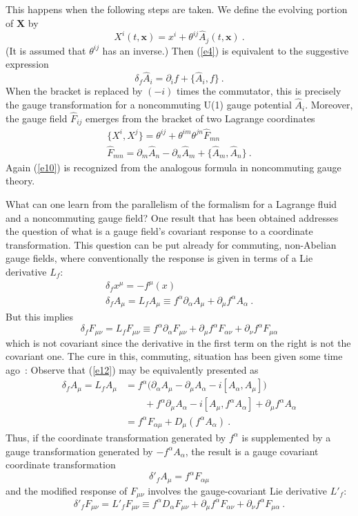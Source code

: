 \documentclass[a4paper,12pt,twoside]{article}
\newcommand{\numeq}[2]{\begin{equation}
#2
\label{#1}
\end{equation}}
\newcommand{\refeq}[1]{(\ref{#1})}
\let\vec\boldsymbol
\let\hat\widehat
\begin{document}
This happens when the following steps are taken. We define the evolving portion of $\vec X$ by 
\numeq{e7}{
X^i (t,\vec x) = x^i + \theta^{ij} \hat A_j (t,\vec x)\ .
}
(It is assumed that $\theta^{ij}$ has an inverse.)
Then \refeq{e4} is equivalent to the suggestive expression
\numeq{e8}{
\delta_f \hat A_i = \partial_i f + \bigl\{\hat A_i, f\bigr\}\ .
}
When the bracket is replaced by $(-i)$ times the commutator, this is precisely the gauge
transformation for a noncommuting U(1) gauge potential $\hat A_i$. Moreover, the gauge field
$\hat F_{ij}$ emerges from the bracket of two Lagrange coordinates
\begin{gather}
\bigl\{ X^i, X^j\bigr\} = \theta^{ij} + \theta^{im} \theta^{jn} \hat F_{mn} \label{e9}\\
\hat F_{mn}  = \partial_m \hat A_n - \partial_n \hat A_m + \bigl\{\hat A_m, \hat  A_n\bigr\}\ . 
\label{e10}
\end{gather}
Again \refeq{e10} is recognized from the analogous formula
in noncommuting gauge theory.

What can one learn from the parallelism of the formalism for a Lagrange fluid and a
noncommuting gauge field? One result that has been obtained addresses the question of what
is  a gauge field's covariant response to a coordinate transformation. This question can be put
already for commuting, non-Abelian gauge fields, where conventionally the response is
given in terms of a Lie derivative $L_f$:
\begin{gather}
\delta_f x^\mu = - f^\mu(x) \label{e11}\\
\delta_f A_\mu = L_f A_\mu \equiv f^\alpha \partial_\alpha A_\mu + \partial_\mu f^\alpha
A_\alpha
 \ . 
\label{e12}
\end{gather}
But this implies
\numeq{e13}{
\delta_f F_{\mu\nu} = L_f F_{\mu\nu} \equiv f^\alpha \partial_\alpha F_{\mu\nu} + 
\partial_\mu f^\alpha F_{\alpha\nu} +  \partial_\nu f^\alpha F_{\mu\alpha}  
}
which is not covariant since the derivative in the first term on the right is not the covariant
one. The cure in this, commuting, situation has been given some time ago~\cite{r5}:  Observe
that
\refeq{e12} may be equivalently presented as 
\numeq{e14}{
\begin{aligned}
\delta_f A_\mu = L_f A_\mu &= f^\alpha \bigl(
\partial_\alpha A_\mu -\partial_\mu A_\alpha - i [A_\alpha, A_\mu]
\bigr) \\
&\qquad{}+ f^\alpha \partial_\mu A_\alpha  - i [  A_\mu, f^\alpha A_\alpha] + 
\partial_\mu f^\alpha A_\alpha\\
 &= f^\alpha F_{\alpha\mu} +  D_\mu (f^\alpha A_\alpha)\ .
\end{aligned}
}
Thus, if the coordinate transformation  generated by $f^\alpha$ is supplemented by a  gauge
transformation generated by $-f^\alpha A_\alpha$, the result is a gauge covariant coordinate
transformation
\numeq{e15}{
\delta'_f A_\mu = f^\alpha F_{\alpha\mu}
}
and the modified response of $F_{\mu\nu}$ involves the gauge-covariant Lie derivative $L'_f$:
\numeq{e16}{
\delta'_f F_{\mu\nu} = L'_f F_{\mu\nu} \equiv f^\alpha D_\alpha F_{\mu\nu} + 
\partial_\mu  f^\alpha F_{\alpha\nu} +  \partial_\nu f^\alpha  F_{\mu\alpha} \ .
}
\end{document}
